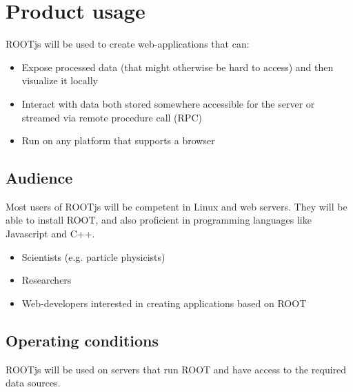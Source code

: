 \chapter{Product usage}

ROOTjs will be used to create web-applications that can:
\begin{itemize}
	\item Expose processed data (that might otherwise be hard to access) and then visualize it locally
	\item Interact with data both stored somewhere accessible for the server or streamed via remote procedure call (RPC)
	\item Run on any platform that supports a browser
\end{itemize}


\section{Audience}
Most users of ROOTjs will be competent in Linux and web servers. They will be able to install ROOT, and also proficient in programming languages like Javascript and C++.
\begin{itemize}
	\item Scientists (e.g. particle physicists)
	\item Researchers
	\item Web-developers interested in creating applications based on ROOT
\end{itemize}

\section{Operating conditions}

ROOTjs will be used on servers that run ROOT and have access to the required data sources.
